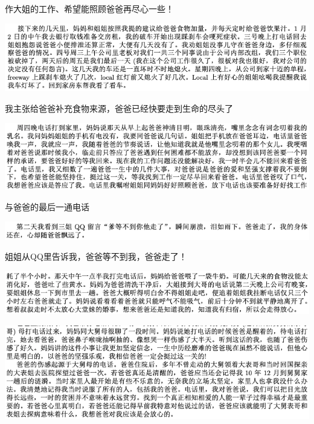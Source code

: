 \documentclass[9pt, b5paper]{article}
\begin{document}
作大姐的工作、希望能照顾爸爸再尽心一些！

\begin{center}
\includegraphics[width=.9\linewidth]{./pic/backups_plans_20210416_164133.png}
\end{center}

我主张给爸爸补充食物来源，爸爸已经快要走到生命的尽头了

\begin{center}
\includegraphics[width=.9\linewidth]{./pic/backups_plans_20210415_092537.png}
\end{center}

与爸爸的最后一通电话

\begin{center}
\includegraphics[width=.9\linewidth]{./pic/backups_plans_20210415_092647.png}
\end{center}

姐姐从QQ里告诉我，爸爸等不到我，爸爸走了！

\begin{center}
\includegraphics[width=.9\linewidth]{./pic/backups_plans_20210415_103141.png}
\end{center}

\begin{center}
\includegraphics[width=.9\linewidth]{./pic/backups_plans_20210415_131810.png}
\end{center}
\end{document}
